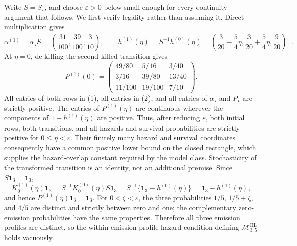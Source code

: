 Write \(S=S_{\star}\), and choose \(\varepsilon>0\) below small enough for every continuity argument that follows. We first verify legality rather than assuming it. Direct multiplication gives
\[
 \alpha^{(1)}=\alpha_{\star}S
 =\left(\frac{31}{100},\frac{39}{100},\frac3{10}\right),
 \qquad
 h^{(1)}(\eta)=S^{-1}h^{(0)}(\eta)
 =\left(\frac3{20}-\frac54\eta,\frac3{20}+\frac54\eta,\frac9{20}\right)^{\!\top}. \tag{1}
\]
At \(\eta=0\), de-killing the second killed transition gives
\[
 P^{(1)}(0)=
 \begin{pmatrix}
 49/80&5/16&3/40\\
 3/16&39/80&13/40\\
 11/100&19/100&7/10
 \end{pmatrix}.                                                \tag{2}
\]
All entries of both rows in (1), all entries in (2), and all entries of \(\alpha_{\star}\) and \(P_{\star}\) are strictly positive. The entries of \(P^{(1)}(\eta)\) are continuous wherever the components of \(1-h^{(1)}(\eta)\) are positive. Thus, after reducing \(\varepsilon\), both initial rows, both transitions, and all hazards and survival probabilities are strictly positive for \(0\le\eta<\varepsilon\). Their finitely many hazard and survival coordinates consequently have a common positive lower bound on the closed rectangle, which supplies the hazard-overlap constant required by the model class. Stochasticity of the transformed transition is an identity, not an additional premise. Since \(S\mathbf 1_3=\mathbf 1_3\),
\[
 K_0^{(1)}(\eta)\mathbf 1_3
 =S^{-1}K_0^{(0)}(\eta)S\mathbf 1_3
 =S^{-1}\{\mathbf 1_3-h^{(0)}(\eta)\}
 =\mathbf 1_3-h^{(1)}(\eta),                                  \tag{3}
\]
and hence \(P^{(1)}(\eta)\mathbf 1_3=\mathbf 1_3\). For \(0<\zeta<\varepsilon\), the three probabilities \(1/5\), \(1/5+\zeta\), and \(4/5\) are distinct and strictly between zero and one; the complementary zero-emission probabilities have the same properties. Therefore all three emission profiles are distinct, so the within-emission-profile hazard condition defining \(\mathcal M^{\mathrm{HL}}_{3,5}\) holds vacuously.

